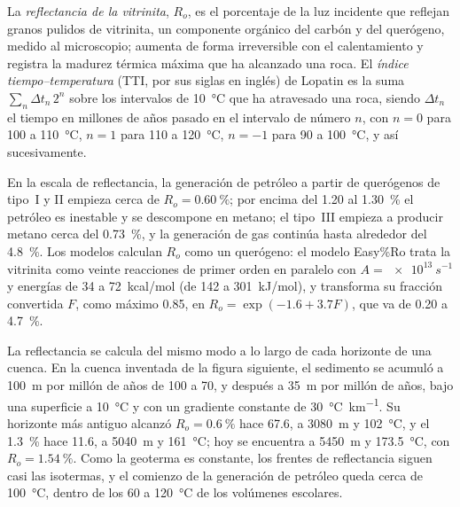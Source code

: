 \begin{definition}\label{def:b2:energy-geology:maturity}
La \emph{reflectancia de la vitrinita}, $R_o$, es el porcentaje de la luz
incidente que reflejan granos pulidos de vitrinita, un componente orgánico del carbón y del querógeno,
medido al microscopio; aumenta de forma irreversible con el calentamiento y registra la madurez térmica máxima que ha alcanzado una roca. El
\emph{índice tiempo--temperatura} (TTI, por sus siglas en inglés) de Lopatin es la suma
$\sum_n \Delta t_n\,2^n$ sobre los intervalos de \qty{10}{\celsius} que ha atravesado una roca,
siendo $\Delta t_n$ el tiempo en millones de años pasado en el intervalo de número $n$, con $n = 0$
para 100 a \qty{110}{\celsius}, $n = 1$ para 110 a \qty{120}{\celsius}, $n = -1$ para 90 a
\qty{100}{\celsius}, y así sucesivamente.
\end{definition}

En la escala de reflectancia, la generación de petróleo a partir de querógenos de tipo~I y II empieza cerca de $R_o =
\qty{0.60}{\percent}$; por encima del 1.20 al \qty{1.30}{\percent} el petróleo es inestable y se descompone en
metano; el tipo~III empieza a producir metano cerca del \qty{0.73}{\percent}, y la generación de gas continúa hasta
alrededor del \qty{4.8}{\percent}. Los modelos calculan $R_o$ como un querógeno: el modelo Easy\%Ro
trata la vitrinita como veinte reacciones de primer orden en paralelo con $A = \qty{e13}{s^{-1}}$ y energías
de 34 a \qty{72}{kcal/mol} (de 142 a \qty{301}{kJ/mol}), y transforma su fracción convertida $F$,
como máximo 0.85, en $R_o = \exp(-1.6 + 3.7F)$, que va de 0.20 a \qty{4.7}{\percent}.

La reflectancia se calcula del mismo modo a lo largo de cada horizonte de una cuenca. En la cuenca inventada de la
figura siguiente, el sedimento se acumuló a \qty{100}{m} por millón de años de 100 a \qty{70}{\Ma},
y después a \qty{35}{m} por millón de años, bajo una superficie a \qty{10}{\celsius} y con un gradiente constante
de \qty{30}{\celsius\per\km}. Su horizonte más antiguo alcanzó $R_o = \qty{0.6}{\percent}$ hace
\qty{67.6}{\Ma}, a \qty{3080}{m} y \qty{102}{\celsius}, y el \qty{1.3}{\percent} hace
\qty{11.6}{\Ma}, a \qty{5040}{m} y \qty{161}{\celsius}; hoy se encuentra a \qty{5450}{m} y
\qty{173.5}{\celsius}, con $R_o = \qty{1.54}{\percent}$. Como la geoterma es constante, los
frentes de reflectancia siguen casi las isotermas, y el comienzo de la generación de petróleo queda cerca de
\qty{100}{\celsius}, dentro de los 60 a \qty{120}{\celsius} de los volúmenes escolares.

